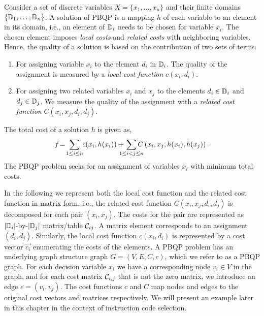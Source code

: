 Consider a set of discrete variables $X=\{x_1,\ldots,x_n\}$ and their
finite domains $\{\mathbb D_1,\ldots,\mathbb D_n\}$. A solution of
PBQP is a mapping $h$ of each variable to an element in its domain,
i.e., an element of $\mathbb D_i$ needs to be chosen for variable
$x_i$. The chosen element imposes \emph{local costs} and \emph{related costs} with
neighboring variables.  Hence, the
quality of a solution is based on the contribution of two sets of
terms.
\begin{enumerate}
\item For assigning variable $x_i$ to the element $d_i$ in
  $\mathbb D_i$. The quality of the assignment is measured by a
  \emph{local cost function} $c(x_i, d_i)$.
\item For assigning two related variables $x_i$ and $x_j$ to the
  elements $d_i \in \mathbb D_i$ and $d_j \in \mathbb D_j$.  We
  measure the quality of the assignment with a \emph{related cost
    function\/} $C(x_i,x_j, d_i,d_j)$.
\end{enumerate}
The total cost of a solution $h$ is given as,
\begin{equation}
  f\! =\! \sum_{1 \leq i \leq n} \hspace{-1mm} c(x_i,h(x_i)) + \hspace{-3mm} \sum_{1 \leq i < j  \leq n} \hspace{-3.5mm}
  C\left (x_i,x_j, h(x_i), h(x_j) \right). \label{eqn-pbqp}
\end{equation}
The PBQP problem seeks for an assignment of variables $x_i$ with
minimum total costs.

In the following we represent both the local cost function and the
related cost function in matrix form, i.e., the related cost function
$C(x_i,x_j,d_i,d_j)$ is decomposed for each pair $(x_i,x_j)$. The
costs for the pair are represented as $|\mathbb D_i|\textrm{-by-}|\mathbb D_j|$ matrix/table ${\mathcal
  C}_{ij}$. A matrix element corresponds to an assignment $(d_i,
d_j)$. Similarly, the local cost function $c(x_i,d_i)$ is represented
by a cost vector $\vec{c_i}$ enumerating the costs of the elements.  A
PBQP problem has an underlying graph structure graph $G=(V,E,C,c)$,
which we refer to as a PBQP graph. For each decision variable $x_i$ we
have a corresponding node $v_i \in V$ in the graph, and for each cost
matrix ${\mathcal C}_{i,j}$ that is not the zero matrix, we
introduce an edge $e=(v_i,v_j)$. The cost functions $c$ and $C$ map
nodes and edges to the original cost vectors and matrices
respectively.  We will present an example later in this chapter in the
context of instruction code selection.

